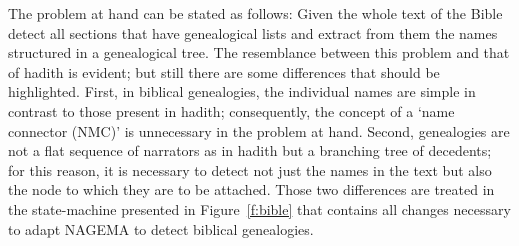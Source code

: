 \documentclass[11pt]{article}
\begin{document}
\begin{figure}[tb]
\end{figure}

The problem at hand can be stated as follows: Given the whole text of the Bible detect all sections that have genealogical lists
and extract from them the names structured in a genealogical tree. The resemblance between this problem and that of hadith is evident; 
but still there are some differences that should be highlighted. 
First, in biblical genealogies, the individual names are simple in contrast to those present in hadith; 
consequently, the concept of a `name connector (NMC)' is unnecessary in the problem at hand.
Second, genealogies are not a flat sequence of narrators as in hadith but a branching tree of decedents; 
for this reason, it is necessary to detect not just the names in the text but also the node to which they are to be attached.
Those two differences are treated in the state-machine presented in Figure~\ref{f:bible} that contains all changes necessary to adapt NAGEMA to detect 
biblical genealogies.
\end{document}
